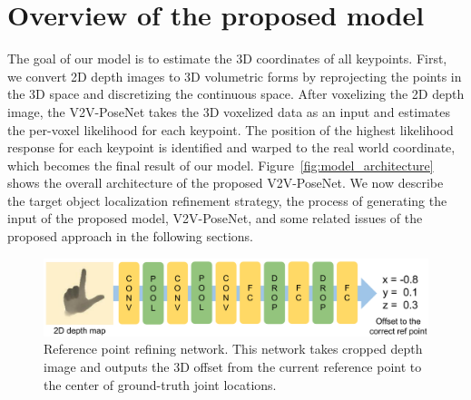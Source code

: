 \section{Overview of the proposed model}

The goal of our model is to estimate the 3D coordinates of all keypoints. First, we convert 2D depth images to 3D volumetric forms by reprojecting the points in the 3D space and discretizing the continuous space. After voxelizing the 2D depth image, the V2V-PoseNet takes the 3D voxelized data as an input and estimates the per-voxel likelihood for each keypoint. The position of the highest likelihood response for each keypoint is identified and warped to the real world coordinate, which becomes the final result of our model. Figure~\ref{fig:model_architecture} shows the overall architecture of the proposed V2V-PoseNet. We now describe the target object localization refinement strategy, the process of generating the input of the proposed model, V2V-PoseNet, and some related issues of the proposed approach in the following sections.

\begin{figure}[t]
\begin{center}
   \includegraphics[width=1.0\linewidth]{ref_refine_net.pdf}
\end{center}
\vspace*{-5mm}
   \caption{Reference point refining network. This network takes cropped depth image and outputs the 3D offset from the current reference point to the center of ground-truth joint locations.}
\vspace*{-3mm}
\label{fig:ref_refine_net}
\end{figure}


